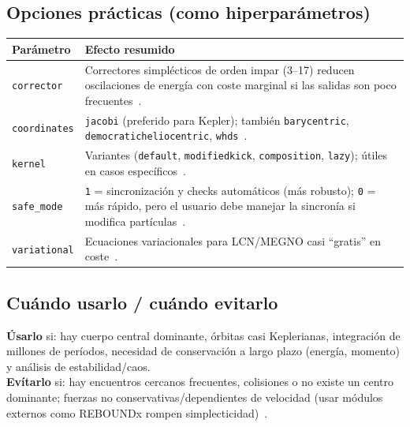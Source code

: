 \subsection{Opciones prácticas (como hiperparámetros)}
\begin{center}
\begin{tabular}{lp{9.2cm}}
\hline %
\textbf{Parámetro} & \textbf{Efecto resumido} \\
\hline %
\texttt{corrector} & Correctores simplécticos de orden impar (3--17) reducen oscilaciones de energía con coste marginal si las salidas son poco frecuentes~\cite{ReinTamayo2015}. \\
\texttt{coordinates} & \texttt{jacobi} (preferido para Kepler); también \texttt{barycentric}, \texttt{democraticheliocentric}, \texttt{whds}~\cite{ReboundIntegratorsDoc}. \\
\texttt{kernel} & Variantes (\texttt{default}, \texttt{modifiedkick}, \texttt{composition}, \texttt{lazy}); útiles en casos específicos~\cite{ReboundIntegratorsDoc}. \\
\texttt{safe\_mode} & \texttt{1} = sincronización y checks automáticos (más robusto); \texttt{0} = más rápido, pero el usuario debe manejar la sincronía si modifica partículas~\cite{ReboundIntegratorsDoc}. \\
\texttt{variational} & Ecuaciones variacionales para LCN/MEGNO casi “gratis” en coste~\cite{ReinTamayo2015,Rein2012}. \\
\hline %
\end{tabular}
\end{center}

\subsection{Cuándo usarlo / cuándo evitarlo}
\textbf{Úsarlo} si: hay cuerpo central dominante, órbitas casi Keplerianas, integración de millones de períodos, necesidad de conservación a largo plazo (energía, momento) y análisis de estabilidad/caos. \\
\textbf{Evítarlo} si: hay encuentros cercanos frecuentes, colisiones o no existe un centro dominante; fuerzas no conservativas/dependientes de velocidad (usar módulos externos como REBOUNDx rompen simplecticidad)~\cite{ReboundWHFastAdvanced,Hairer2006}.
